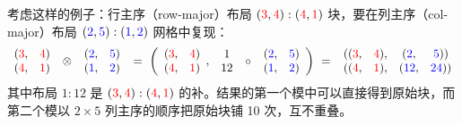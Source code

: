考虑这样的例子：行主序（row-major）布局 $(\textcolor{red}{3},\textcolor{red}{4}):(\textcolor{red}{4},\textcolor{red}{1})$ 块，要在列主序（col-major）布局 $(\textcolor{blue}{2},\textcolor{blue}{5}):(\textcolor{blue}{1},\textcolor{blue}{2})$ 网格中复现：
\begin{align*}
\begin{array}{cc} (\textcolor{red}{3}, & \textcolor{red}{4}) \\ (\textcolor{red}{4}, & \textcolor{red}{1}) \end{array}
\ \otimes \
\begin{array}{cc} (\textcolor{blue}{2}, & \textcolor{blue}{5}) \\ (\textcolor{blue}{1}, & \textcolor{blue}{2}) \end{array}
\ =\
\left(
\begin{array}{cc} (\textcolor{red}{3}, & \textcolor{red}{4}) \\ (\textcolor{red}{4}, & \textcolor{red}{1}) \end{array}, \
\begin{array}{c} 1 \\ 12 \end{array}
\ \circ \
\begin{array}{cc}(\textcolor{blue}{2}, & \textcolor{blue}{5}) \\ (\textcolor{blue}{1},& \textcolor{blue}{2}) \end{array}
\right)
\ = \
\begin{array}{cccc}((\textcolor{red}{3}, & \textcolor{red}{4}), & (\textcolor{blue}{2}, & \textcolor{blue}{5})) \\ ((\textcolor{red}{4}, & \textcolor{red}{1}), & (\textcolor{blue}{12}, & \textcolor{blue}{24})) \end{array}
\end{align*}
其中布局 $1:12$ 是 $(\textcolor{red}{3},\textcolor{red}{4}):(\textcolor{red}{4},\textcolor{red}{1})$ 的补。结果的第一个模中可以直接得到原始块，而第二个模以 $2\times 5$ 列主序的顺序把原始块铺 10 次，互不重叠。

